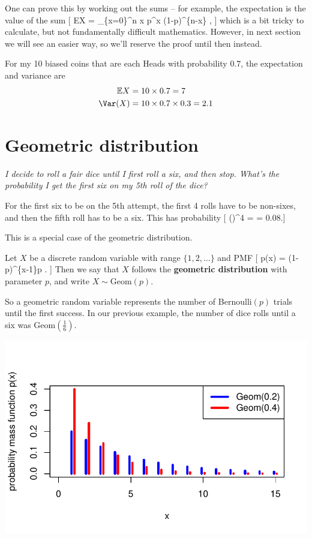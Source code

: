 \documentclass[
  letterpaper,
  DIV=11,
  numbers=noendperiod]{scrreprt}
\theoremstyle{remark}
\begin{document}
One can prove this by working out the sums -- for example, the
expectation is the value of the sum {[} \mathbb EX = \sum\_\{x=0\}\^{}n
x  p\^{}x (1-p)\^{}\{n-x\} , {]} which is a bit tricky to
calculate, but not fundamentally difficult mathematics. However, in next
section we will see an easier way, so we'll reserve the proof until then
instead.

For my 10 biased coins that are each Heads with probability \(0.7\), the
expectation and variance are \begin{align*}
  \mathbb EX &= 10 \times 0.7 = 7 \\
  \Var(X) &= 10 \times 0.7 \times 0.3 = 2.1
\end{align*}

\hypertarget{geometric}{%
\section{Geometric distribution}\label{geometric}}

\emph{I decide to roll a fair dice until I first roll a six, and then
stop. What's the probability I get the first six on my 5th roll of the
dice?}

For the first six to be on the 5th attempt, the first 4 rolls have to be
non-sixes, and then the fifth roll has to be a six. This has probability
{[} \left(\right)\^{}4 \times  {} =  =
0.08.{]}

This is a special case of the geometric distribution.

Let \(X\) be a discrete random variable with range \(\{1,2,\dots\}\) and
PMF {[} p(x) = (1-p)\^{}\{x-1\}p . {]} Then we say that \(X\) follows
the \textbf{geometric distribution} with parameter \(p\), and write
\(X \sim \text{Geom}(p)\).

So a geometric random variable represents the number of Bernoulli\((p)\)
trials until the first success. In our previous example, the number of
dice rolls until a six was \(\text{Geom}(\frac16)\).

\includegraphics{sections/L11-binomial-geometric_files/figure-pdf/geom-pic-1.pdf}
\end{document}
